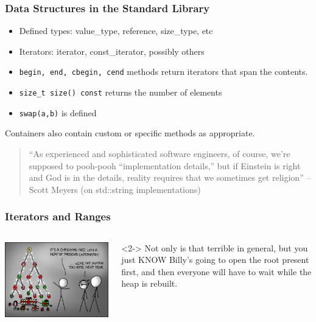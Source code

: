 \begin{frame}[fragile]
\frametitle{Data Structures in the Standard Library}
\begin{itemize}
\item Defined types: value\_type, reference, size\_type, etc
\item Iterators:  iterator, const\_iterator, possibly others
\item \texttt{begin, end, cbegin, cend} methods return iterators that
  span the contents.
\item \texttt{size\_t size() const} returns the number of elements
\item \texttt{swap(a,b)} is defined
\end{itemize}

Containers also contain custom or specific methods as appropriate.

\begin{quotation}
``As experienced and sophisticated software engineers, of course, we're
supposed to pooh-pooh ``implementation details,'' but if Einstein is
right and God is in the details, reality requires that we sometimes
get religion'' -- Scott Meyers (on std::string implementations)
\end{quotation}

\end{frame}


\begin{frame}[fragile]
\frametitle{Iterators and Ranges}
\begin{columns}[t]

\includegraphics[scale=0.4]{tree.png}

<2->
\vskip 24pt
Not only is that terrible in general, but you just KNOW Billy's going to open the root present first, and then everyone will have to wait while the heap is rebuilt.
\end{columns}

\end{frame}

